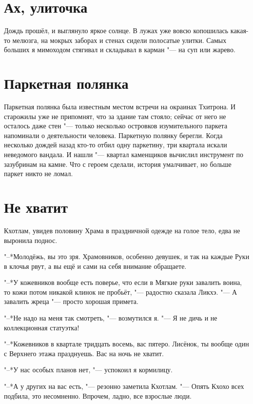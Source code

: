 \documentclass[a4paper,10pt]{book}
\begin{document}
 \section{Ах, улиточка}

 Дождь прошёл, и выглянуло яркое солнце. В лужах уже вовсю копошилась какая-то мелюзга, на мокрых заборах и стенах сидели полосатые улитки. Самых больших я мимоходом стягивал и складывал в карман "--- на суп или жарево.
 
\section{Паркетная полянка}
 
Паркетная полянка была известным местом встречи на окраинах Тхитрона. И старожилы уже не припомнят, что за здание там стояло; сейчас от него не осталось даже стен "--- только несколько островков изумительного паркета напоминали о деятельности человека. Паркетную полянку берегли. Когда несколько дождей назад кто-то отбил одну паркетину, три квартала
искали неведомого вандала. И нашли "--- квартал каменщиков вычислил инструмент по зазубринам на камне. Что с героем сделали, история умалчивает, но больше паркет никто не ломал.

 \section{Не хватит}

 Кхотлам, увидев половину Храма в праздничной одежде на голое тело, едва не выронила поднос.

"--*Молодёжь, вы это зря. Храмовников, особенно девушек, и так на каждые Руки в клочья рвут, а вы ещё и сами на себя внимание обращаете.

"--*У кожевников вообще есть поверье, что если в Мягкие руки завалить воина, то кожи потом никакой клинок не пробьёт, "--- радостно сказала Ликхэ. "--- А завалить жреца "--- просто хорошая примета.

"--*Не надо на меня так смотреть, "--- возмутился я. "--- Я не дичь и не коллекционная статуэтка!

"--*Кожевников в квартале тридцать восемь, вас пятеро. Лисёнок, ты вообще один с Верхнего этажа празднуешь. Вас на ночь не хватит.

"--*У нас особых планов нет, "--- успокоил я кормилицу.

"--*А у других на вас есть, "--- резонно заметила Кхотлам. "--- Опять Кхохо всех подбила, это несомненно. Впрочем, ладно, все взрослые люди.
 
\end{document}
